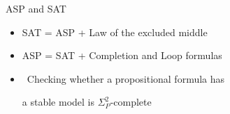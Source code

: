 \begin{frame}{ASP and SAT}
  \bigskip
  \begin{itemize}
  \item<2-> SAT = {ASP + {Law of the excluded middle}%
      }
    \medskip
  \item<2-> ASP = {SAT + {Completion and Loop formulas}}
    \bigskip
    \bigskip
  \item<4->  \
    Checking whether a propositional formula has\par a stable model is $\Sigma^2_P$-complete
  \end{itemize}
\end{frame}
%
